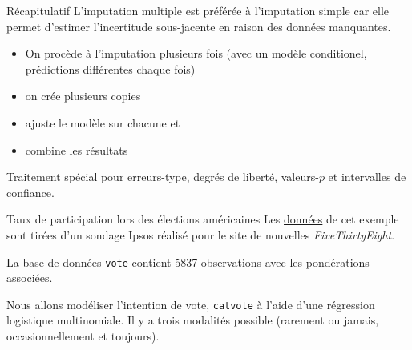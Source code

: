 \documentclass[
  ignorenonframetext,
]{beamer}
\providecommand{\tightlist}{%
  \setlength{\itemsep}{0pt}\setlength{\parskip}{0pt}}\usepackage{longtable,booktabs,array}
\begin{document}
\begin{frame}{Récapitulatif}
\protect\hypertarget{ruxe9capitulatif-1}{}
L'imputation multiple est préférée à l'imputation simple car elle permet
d'estimer l'incertitude sous-jacente en raison des données manquantes.

\begin{itemize}
\tightlist
\item
  On procède à l'imputation plusieurs fois (avec un modèle conditionel,
  prédictions différentes chaque fois)
\item
  on crée plusieurs copies
\item
  ajuste le modèle sur chacune et
\item
  combine les résultats
\end{itemize}

Traitement spécial pour erreurs-type, degrés de liberté, valeurs-\(p\)
et intervalles de confiance.
\end{frame}

\begin{frame}[fragile]{Taux de participation lors des élections
américaines}
\protect\hypertarget{taux-de-participation-lors-des-uxe9lections-amuxe9ricaines}{}
Les
\href{https://github.com/fivethirtyeight/data/tree/master/non-voters}{données}
de cet exemple sont tirées d'un sondage Ipsos réalisé pour le site de
nouvelles \emph{FiveThirtyEight}.

La base de données \texttt{vote} contient 5837 observations avec les
pondérations associées.

Nous allons modéliser l'intention de vote, \texttt{catvote} à l'aide
d'une régression logistique multinomiale. Il y a trois modalités
possible (rarement ou jamais, occasionnellement et toujours).
\end{frame}
\end{document}
